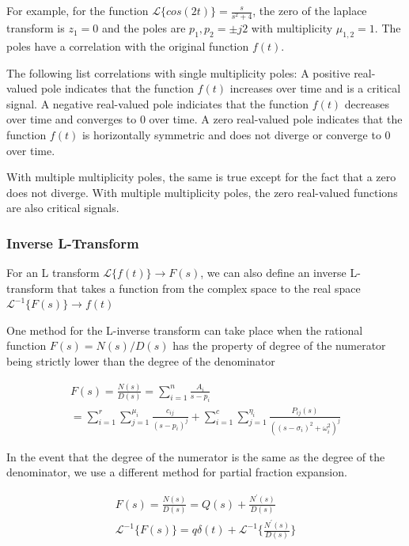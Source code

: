 \documentclass[11pt]{article}
\begin{document}
For example, for the function $\mathcal{L}\{ cos (2t) \} = \frac{s}{s^2+4}$, the zero of the laplace transform is $z_1 = 0$ and the poles are $p_1, p_2 = \pm j2$ with multiplicity $\mu_{1,2} = 1$.
The poles have a correlation with the original function $f(t)$.

The following list correlations with single multiplicity poles:
A positive real-valued pole indicates that the function $f(t)$ increases over time and is a critical signal.
A negative real-valued pole indiciates that the function $f(t)$ decreases over time and converges to 0 over time.
A zero real-valued pole indicates that the function $f(t)$ is horizontally symmetric and does not diverge or converge to 0 over time.

With multiple multiplicity poles, the same is true except for the fact that a zero does not diverge.
With multiple multiplicity poles, the zero real-valued functions are also critical signals.

\subsubsection{Inverse L-Transform}
For an L transform $\mathcal{L}\{ f(t) \} \to F(s)$, we can also define an inverse L-transform that takes a function from the complex space to the real space $\mathcal{L}^{-1}\{ F(s) \} \to f(t)$

One method for the L-inverse transform can take place when the rational function $F(s) = N(s) / D(s)$ has the property of degree of the numerator being strictly lower than the degree of the denominator

\begin{gather}
  F(s) = \frac{N(s)}{D(s)} = \sum_{i=1}^n \frac{A_i}{s-p_i} \\
  = \sum_{i=1}^{r} \sum_{j=1}^{\mu_i} \frac{c_{ij}}{(s-p_i)^j} + \sum_{i=1}^{c} \sum_{j=1}^{\eta_i} \frac{P_{ij} (s)}{((s-\sigma_i)^2 + \omega_i^2)^j}
\end{gather}

In the event that the degree of the numerator is the same as the degree of the denominator, we use a different method for partial fraction expansion.

\begin{gather}
 F(s) = \frac{N(s)}{D(s)} = Q(s) + \frac{N^\prime (s)}{D(s)} \\
 \mathcal{L}^{-1}\{ F(s) \} = q \delta (t) + \mathcal{L}^{-1}\{ \frac{N^\prime (s)}{D(s)} \}
\end{gather}
\end{document}
